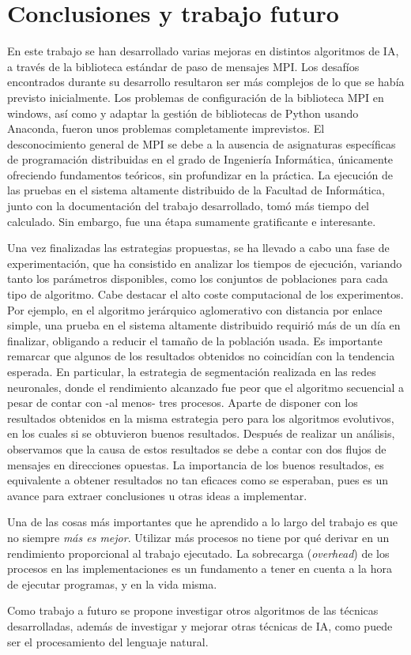 \chapter{Conclusiones y trabajo futuro}
\label{cap:c5_conclu}

	En este trabajo se han desarrollado varias mejoras en distintos algoritmos de IA, a través de la biblioteca estándar de paso de mensajes MPI. Los desafíos encontrados durante su desarrollo resultaron ser más complejos de lo que se había previsto inicialmente. Los problemas de configuración de la biblioteca MPI en windows, así como y adaptar la gestión de bibliotecas de Python usando Anaconda, fueron unos problemas completamente imprevistos. El desconocimiento general de  MPI se debe a la ausencia de asignaturas específicas de programación distribuidas en el grado de Ingeniería Informática, únicamente ofreciendo fundamentos teóricos, sin profundizar en la práctica. La ejecución de las pruebas en el sistema altamente distribuido de la Facultad de Informática, junto con la documentación del trabajo desarrollado, tomó más tiempo del calculado. Sin embargo, fue una étapa sumamente gratificante e interesante. 
	
		
	Una vez finalizadas las estrategias propuestas, se ha llevado a cabo una fase de experimentación, que ha consistido en analizar los tiempos de ejecución, variando tanto los parámetros disponibles, como los conjuntos de poblaciones para cada tipo de algoritmo. Cabe destacar el alto coste computacional de los experimentos. Por ejemplo, en el algoritmo jerárquico aglomerativo con distancia por enlace simple, una prueba en el sistema altamente distribuido requirió más de un día en finalizar, obligando a reducir el tamaño de la población usada. Es importante remarcar que algunos de los resultados obtenidos no coincidían con la tendencia esperada. En particular, la estrategia de segmentación realizada en las redes neuronales, donde el rendimiento alcanzado fue peor que el algoritmo secuencial a pesar de contar con -al menos- tres procesos. Aparte de disponer con los resultados obtenidos en la misma estrategia pero para los algoritmos evolutivos, en los cuales si se obtuvieron buenos resultados. Después de realizar un análisis, observamos que la causa de estos resultados se debe a contar con dos flujos de mensajes en direcciones opuestas. La importancia de los buenos resultados, es equivalente a obtener resultados no tan eficaces como se esperaban, pues es un avance para extraer conclusiones u otras ideas a implementar.
	

	Una de las cosas más importantes que he aprendido a lo largo del trabajo es que no siempre \textit{más es mejor}. Utilizar más procesos no tiene por qué derivar en un rendimiento proporcional al trabajo ejecutado. La sobrecarga (\textit{overhead}) de los procesos en las implementaciones es un fundamento a tener en cuenta a la hora de ejecutar programas, y en la vida misma.	
	
	
	Como trabajo a futuro se propone investigar otros algoritmos de las técnicas desarrolladas, además de investigar y mejorar otras técnicas de IA, como puede ser el procesamiento del lenguaje natural.
	
	
	
	
	